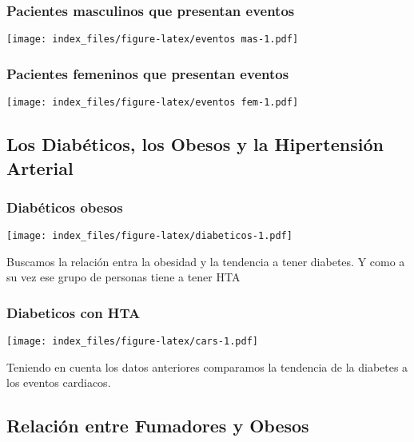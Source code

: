 \documentclass[
]{article}
\begin{document}
\hypertarget{pacientes-masculinos-que-presentan-eventos}{%
\subsubsection{Pacientes masculinos que presentan
eventos}\label{pacientes-masculinos-que-presentan-eventos}}

\texttt{[image: index\_files/figure-latex/eventos mas-1.pdf]}

\hypertarget{pacientes-femeninos-que-presentan-eventos}{%
\subsubsection{Pacientes femeninos que presentan
eventos}\label{pacientes-femeninos-que-presentan-eventos}}

\texttt{[image: index\_files/figure-latex/eventos fem-1.pdf]}

\hypertarget{los-diabuxe9ticos-los-obesos-y-la-hipertensiuxf3n-arterial}{%
\subsection{Los Diabéticos, los Obesos y la Hipertensión
Arterial}\label{los-diabuxe9ticos-los-obesos-y-la-hipertensiuxf3n-arterial}}

\hypertarget{diabuxe9ticos-obesos}{%
\subsubsection{Diabéticos obesos}\label{diabuxe9ticos-obesos}}

\texttt{[image: index\_files/figure-latex/diabeticos-1.pdf]}

Buscamos la relación entra la obesidad y la tendencia a tener diabetes.
Y como a su vez ese grupo de personas tiene a tener HTA

\hypertarget{diabeticos-con-hta}{%
\subsubsection{Diabeticos con HTA}\label{diabeticos-con-hta}}

\texttt{[image: index\_files/figure-latex/cars-1.pdf]}

Teniendo en cuenta los datos anteriores comparamos la tendencia de la
diabetes a los eventos cardiacos.

\hypertarget{relaciuxf3n-entre-fumadores-y-obesos}{%
\subsection{Relación entre Fumadores y
Obesos}\label{relaciuxf3n-entre-fumadores-y-obesos}}
\end{document}
